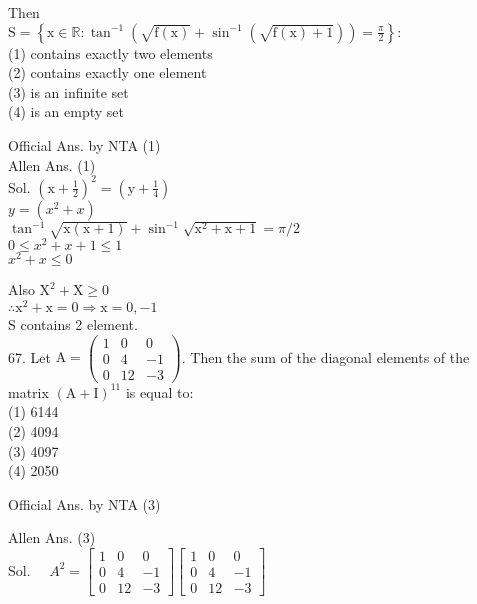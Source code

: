 \documentclass[10pt]{article}
\begin{document}
Then\\
\(\mathrm{S}=\left\{\mathrm{x} \in \mathbb{R}: \tan ^{-1}\left(\sqrt{\mathrm{f}(\mathrm{x})}+\sin ^{-1}(\sqrt{\mathrm{f}(\mathrm{x})+1})\right)=\frac{\pi}{2}\right\}:\)\\
(1) contains exactly two elements\\
(2) contains exactly one element\\
(3) is an infinite set\\
(4) is an empty set

Official Ans. by NTA (1)\\
Allen Ans. (1)\\
Sol. \(\left(\mathrm{x}+\frac{1}{2}\right)^{2}=\left(\mathrm{y}+\frac{1}{4}\right)\)\\
\(y=\left(x^{2}+x\right)\)\\
\(\tan ^{-1} \sqrt{\mathrm{x}(\mathrm{x}+1)}+\sin ^{-1} \sqrt{\mathrm{x}^{2}+\mathrm{x}+1}=\pi / 2\)\\
\(0 \leq x^{2}+x+1 \leq 1\)\\
\(x^{2}+x \leq 0\)

Also \(\mathrm{X}^{2}+\mathrm{X} \geq 0\)\\
\(\therefore \mathrm{x}^{2}+\mathrm{x}=0 \Rightarrow \mathrm{x}=0,-1\)\\
S contains 2 element.\\
67. Let \(\mathrm{A}=\left(\begin{array}{ccc}1 & 0 & 0 \\ 0 & 4 & -1 \\ 0 & 12 & -3\end{array}\right)\). Then the sum of the diagonal elements of the matrix \((\mathrm{A}+\mathrm{I})^{11}\) is equal to:\\
(1) 6144\\
(2) 4094\\
(3) 4097\\
(4) 2050

Official Ans. by NTA (3)

Allen Ans. (3)\\
Sol. \(\quad A^{2}=\left[\begin{array}{ccc}1 & 0 & 0 \\ 0 & 4 & -1 \\ 0 & 12 & -3\end{array}\right]\left[\begin{array}{ccc}1 & 0 & 0 \\ 0 & 4 & -1 \\ 0 & 12 & -3\end{array}\right]\)
\end{document}
